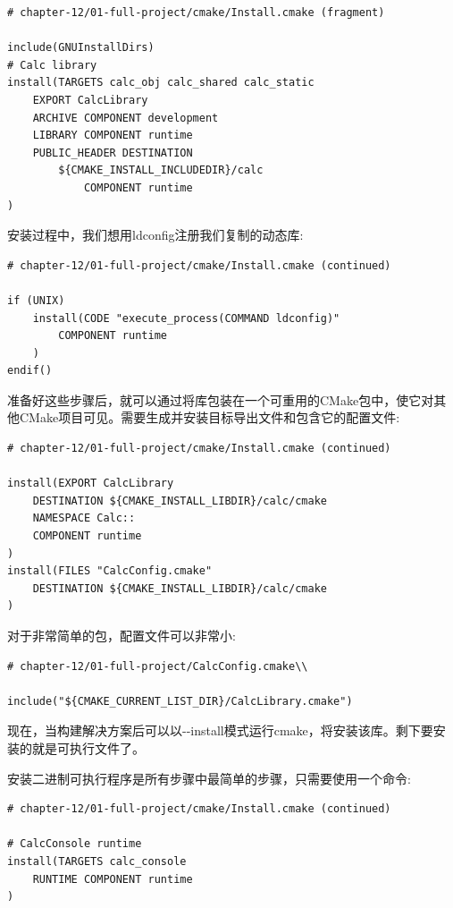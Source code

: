\begin{lstlisting}[style=styleCMake]
# chapter-12/01-full-project/cmake/Install.cmake (fragment)

include(GNUInstallDirs)
# Calc library
install(TARGETS calc_obj calc_shared calc_static
	EXPORT CalcLibrary
	ARCHIVE COMPONENT development
	LIBRARY COMPONENT runtime
	PUBLIC_HEADER DESTINATION
		${CMAKE_INSTALL_INCLUDEDIR}/calc
			COMPONENT runtime
)
\end{lstlisting}

安装过程中，我们想用ldconfig注册我们复制的动态库:

\begin{lstlisting}[style=styleCMake]
# chapter-12/01-full-project/cmake/Install.cmake (continued)

if (UNIX)
	install(CODE "execute_process(COMMAND ldconfig)"
		COMPONENT runtime
	)
endif()
\end{lstlisting}

准备好这些步骤后，就可以通过将库包装在一个可重用的CMake包中，使它对其他CMake项目可见。需要生成并安装目标导出文件和包含它的配置文件:

\begin{lstlisting}[style=styleCMake]
# chapter-12/01-full-project/cmake/Install.cmake (continued)

install(EXPORT CalcLibrary
	DESTINATION ${CMAKE_INSTALL_LIBDIR}/calc/cmake
	NAMESPACE Calc::
	COMPONENT runtime
)
install(FILES "CalcConfig.cmake"
	DESTINATION ${CMAKE_INSTALL_LIBDIR}/calc/cmake
)
\end{lstlisting}

对于非常简单的包，配置文件可以非常小:

\begin{lstlisting}[style=styleCMake]
# chapter-12/01-full-project/CalcConfig.cmake\\

include("${CMAKE_CURRENT_LIST_DIR}/CalcLibrary.cmake")
\end{lstlisting}

现在，当构建解决方案后可以以-{}-install模式运行cmake，将安装该库。剩下要安装的就是可执行文件了。


安装二进制可执行程序是所有步骤中最简单的步骤，只需要使用一个命令:

\begin{lstlisting}[style=styleCMake]
# chapter-12/01-full-project/cmake/Install.cmake (continued)

# CalcConsole runtime
install(TARGETS calc_console
	RUNTIME COMPONENT runtime
)
\end{lstlisting}

